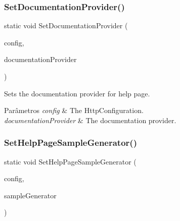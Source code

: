 \subsubsection{\texorpdfstring{Set\+Documentation\+Provider()}{SetDocumentationProvider()}}
{\footnotesize\ttfamily static void Set\+Documentation\+Provider (\begin{DoxyParamCaption}\item[{this Http\+Configuration}]{config,  }\item[{I\+Documentation\+Provider}]{documentation\+Provider }\end{DoxyParamCaption})\hspace{0.3cm}{\ttfamily [static]}}



Sets the documentation provider for help page. 


\begin{DoxyParams}{Parâmetros}
{\em config} & The Http\+Configuration.\\
\hline
{\em documentation\+Provider} & The documentation provider.\\
\hline
\end{DoxyParams}
\mbox{\label{classApi3Layers_1_1Areas_1_1HelpPage_1_1HelpPageConfigurationExtensions_a4788b1a5481baebf9302bad07fa4d784}} 
\subsubsection{\texorpdfstring{Set\+Help\+Page\+Sample\+Generator()}{SetHelpPageSampleGenerator()}}
{\footnotesize\ttfamily static void Set\+Help\+Page\+Sample\+Generator (\begin{DoxyParamCaption}\item[{this Http\+Configuration}]{config,  }\item[{\hyperlink{classApi3Layers_1_1Areas_1_1HelpPage_1_1HelpPageSampleGenerator}{Help\+Page\+Sample\+Generator}}]{sample\+Generator }\end{DoxyParamCaption})\hspace{0.3cm}{\ttfamily [static]}}



